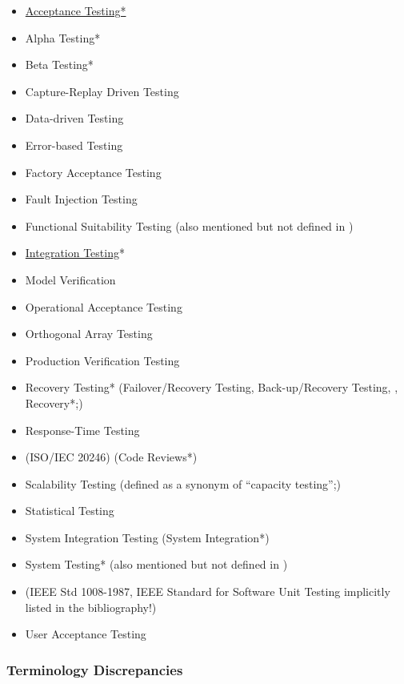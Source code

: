     \begin{itemize}
        \item \underline{Acceptance Testing*}
        \item Alpha Testing*
        \item Beta Testing*
        \item Capture-Replay Driven Testing
        \item Data-driven Testing
        \item Error-based Testing
        \item Factory Acceptance Testing
        \item Fault Injection Testing
        \item Functional Suitability Testing (also mentioned but not defined in
              \citep{IEEE2017})
        \item \underline{Integration Testing}*
        \item Model Verification
        \item Operational Acceptance Testing
        \item Orthogonal Array Testing
        \item Production Verification Testing
        \item Recovery Testing* (Failover/Recovery Testing, Back-up/Recovery
              Testing, ,
              Recovery*;)
        \item Response-Time Testing
        \item {} (ISO/IEC 20246) (Code Reviews*)
        \item Scalability Testing (defined as a synonym of ``capacity
              testing'';)
        \item Statistical Testing
        \item System Integration Testing (System Integration*)
        \item System Testing* (also mentioned but not defined in \citep{IEEE2013})
        \item {}
              (IEEE Std 1008-1987, IEEE Standard for
              Software Unit Testing implicitly listed in the bibliography!)
        \item User Acceptance Testing
    \end{itemize}
\fi

\subsubsection{Terminology Discrepancies}
\label{terms}

